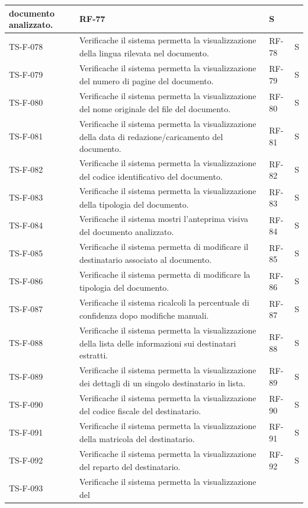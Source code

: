 \documentclass[a4paper,11pt]{article}
\renewcommand{\G}{\texorpdfstring{\textsubscript{\scalebox{0.6}{\textbf{G}}}\xspace}{ G}}
\begin{document}
\begin{longtable}{|p{2.2cm}|p{8.3cm}|p{2cm}|p{1.5cm}|}
documento analizzato. & RF-77 & S \\ \hline
TS-F-078 & Verifica\G che il sistema permetta la visualizzazione della lingua rilevata
nel documento. & RF-78 & S \\ \hline
TS-F-079 & Verifica\G che il sistema permetta la visualizzazione del numero di
pagine del documento. & RF-79 & S \\ \hline
TS-F-080 & Verifica\G che il sistema permetta la visualizzazione del nome originale
del file del documento. & RF-80 & S \\ \hline
TS-F-081 & Verifica\G che il sistema permetta la visualizzazione della data di
redazione/caricamento del documento. & RF-81 & S \\ \hline
TS-F-082 & Verifica\G che il sistema permetta la visualizzazione del codice
identificativo del documento. & RF-82 & S \\ \hline
TS-F-083 & Verifica\G che il sistema permetta la visualizzazione della tipologia del
documento. & RF-83 & S \\ \hline
TS-F-084 & Verifica\G che il sistema mostri l’anteprima visiva
del documento analizzato. & RF-84 & S \\ \hline
TS-F-085 & Verifica\G che il sistema permetta di modificare il
destinatario associato al documento. & RF-85 & S \\ \hline
TS-F-086 & Verifica\G che il sistema permetta di modificare la
tipologia del documento. & RF-86 & S \\ \hline
TS-F-087 & Verifica\G che il sistema ricalcoli la percentuale di
confidenza dopo modifiche manuali. & RF-87 & S \\ \hline
TS-F-088 & Verifica\G che il sistema permetta la visualizzazione della lista delle
informazioni sui destinatari estratti. & RF-88 & S \\ \hline
TS-F-089 & Verifica\G che il sistema permetta la visualizzazione dei
dettagli di un singolo destinatario in lista. & RF-89 & S \\ \hline
TS-F-090 & Verifica\G che il sistema permetta la visualizzazione del codice fiscale
del destinatario. & RF-90 & S \\ \hline
TS-F-091 & Verifica\G che il sistema permetta la visualizzazione della matricola del
destinatario. & RF-91 & S \\ \hline
TS-F-092 & Verifica\G che il sistema permetta la visualizzazione del reparto del
destinatario. & RF-92 & S \\ \hline
TS-F-093 & Verifica\G che il sistema permetta la visualizzazione del

\end{longtable}
\end{document}
